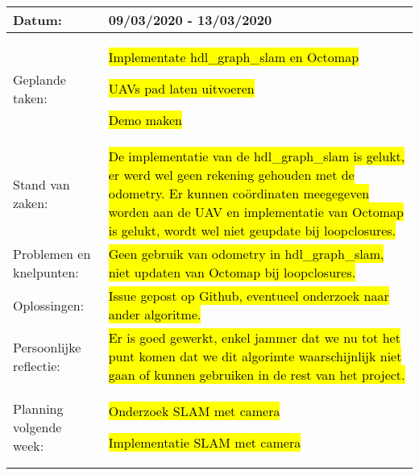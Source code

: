 \begin{tabularx}{\textwidth}{| l | X |}
  \hline
  Datum: & 09/03/2020 - 13/03/2020\\
  \hline
  Geplande taken: &
  \begin{compactitem}
    \item \hl{Implementate hdl\_graph\_slam en Octomap}
    \item \hl{UAVs pad laten uitvoeren}
    \item \hl{Demo maken}
  \end{compactitem}\\
  \hline
  Stand van zaken: & \hl{De implementatie van de hdl\_graph\_slam is gelukt, er werd wel geen rekening gehouden met de odometry. Er kunnen co\"ordinaten meegegeven worden aan de UAV en implementatie van Octomap is gelukt, wordt wel niet geupdate bij loopclosures.}\\
  \hline
  Problemen en knelpunten: & \hl{Geen gebruik van odometry in hdl\_graph\_slam, niet updaten van Octomap bij loopclosures.}\\
  \hline
  Oplossingen: & \hl{Issue gepost op Github, eventueel onderzoek naar ander algoritme.}\\
  \hline
  Persoonlijke reflectie: & \hl{Er is goed gewerkt, enkel jammer dat we nu tot het punt komen dat we dit algorimte waarschijnlijk niet gaan of kunnen gebruiken in de rest van het project.}\\
  \hline
  Planning volgende week: & 
  \begin{compactitem}
    \item \hl{Onderzoek SLAM met camera}
    \item \hl{Implementatie SLAM met camera}
  \end{compactitem}\\
  \hline
\end{tabularx}